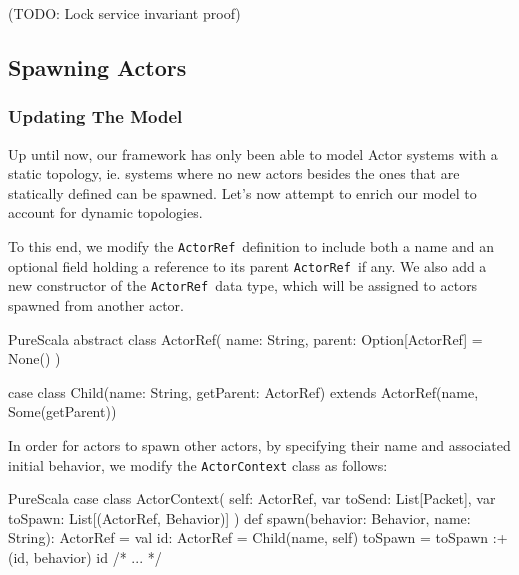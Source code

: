 \documentclass[a4paper,twoside]{article}
\newcommand{\InlineS}[1]{\lstinline[language=PureScala,basicstyle=\small\ttfamily,columns=fixed]|#1|}
\newcommand{\TODO}[1]{\textcolor{YellowOrange}{(TODO: #1)}} %
\newcommand{\ActorRef}{\InlineS{ActorRef}\ }
\newcommand{\stt}[1]{\texttt{\small{#1}}}
\begin{document}
\TODO{Lock service invariant proof}

%

%

\subsection{Spawning Actors}
\label{spawn}

\subsubsection*{Updating The Model}

Up until now, our framework has only been able to model Actor systems with a static topology, ie. systems where no new actors besides the ones that are statically defined can be spawned. Let's now attempt to enrich our model to account for dynamic topologies.

To this end, we modify the \ActorRef definition to include both a name and an optional field holding a reference to its parent \ActorRef if any. We also add a new constructor of the \ActorRef data type, which will be assigned to actors spawned from another actor.

\begin{ShortCode}{PureScala}
abstract class ActorRef(
  name: String,
  parent: Option[ActorRef] = None()
)

case class Child(name: String, getParent: ActorRef)
  extends ActorRef(name, Some(getParent))
\end{ShortCode}

In order for actors to spawn other actors, by specifying their name and associated 
initial behavior, we modify the \stt{ActorContext} class as follows:

\begin{ShortCode}{PureScala}
case class ActorContext(
  self: ActorRef,
  var toSend: List[Packet],
  var toSpawn: List[(ActorRef, Behavior)]
) {
  def spawn(behavior: Behavior, name: String): ActorRef = {
    val id: ActorRef = Child(name, self)
    toSpawn = toSpawn :+ (id, behavior)
    id
  }
  /* ... */
}
\end{ShortCode}
\end{document}
